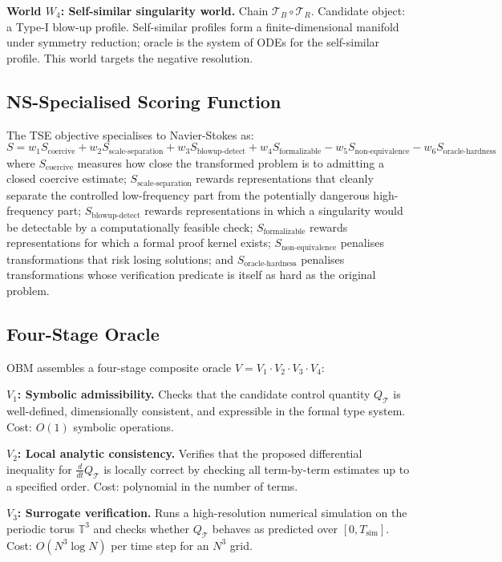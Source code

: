 \textbf{World $W_4$: Self-similar singularity world.} Chain $\mathcal{T}_B \circ \mathcal{T}_R$. Candidate object: a Type-I blow-up profile. Self-similar profiles form a finite-dimensional manifold under symmetry reduction; oracle is the system of ODEs for the self-similar profile. This world targets the negative resolution.

\subsection{NS-Specialised Scoring Function}

The TSE objective specialises to Navier-Stokes as:
\[
S = w_1 S_{\text{coercive}} + w_2 S_{\text{scale-separation}} + w_3 S_{\text{blowup-detect}}
     + w_4 S_{\text{formalizable}} - w_5 S_{\text{non-equivalence}} - w_6 S_{\text{oracle-hardness}}
\]
where $S_{\text{coercive}}$ measures how close the transformed problem is to admitting a closed coercive estimate; $S_{\text{scale-separation}}$ rewards representations that cleanly separate the controlled low-frequency part from the potentially dangerous high-frequency part; $S_{\text{blowup-detect}}$ rewards representations in which a singularity would be detectable by a computationally feasible check; $S_{\text{formalizable}}$ rewards representations for which a formal proof kernel exists; $S_{\text{non-equivalence}}$ penalises transformations that risk losing solutions; and $S_{\text{oracle-hardness}}$ penalises transformations whose verification predicate is itself as hard as the original problem.

\subsection{Four-Stage Oracle}

OBM assembles a four-stage composite oracle $V = V_1 \cdot V_2 \cdot V_3 \cdot V_4$:

\textbf{$V_1$: Symbolic admissibility.} Checks that the candidate control quantity $Q_{\mathcal{T}}$ is well-defined, dimensionally consistent, and expressible in the formal type system. Cost: $O(1)$ symbolic operations.

\textbf{$V_2$: Local analytic consistency.} Verifies that the proposed differential inequality for $\frac{d}{dt}Q_{\mathcal{T}}$ is locally correct by checking all term-by-term estimates up to a specified order. Cost: polynomial in the number of terms.

\textbf{$V_3$: Surrogate verification.} Runs a high-resolution numerical simulation on the periodic torus $\mathbb{T}^3$ and checks whether $Q_{\mathcal{T}}$ behaves as predicted over $[0, T_{\text{sim}}]$. Cost: $O(N^3 \log N)$ per time step for an $N^3$ grid.


